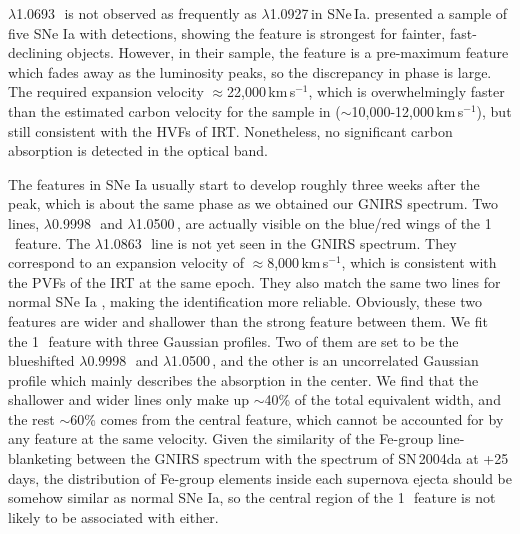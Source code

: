 \documentclass[twocolumn]{aastex631}
\begin{document}
 $\lambda$1.0693\,\micron\ is not observed as frequently as  $\lambda$1.0927\,\micron in SNe\,Ia. \citet{Hsiao_CSP_2019} presented a sample of five SNe Ia with  detections, showing the  feature is strongest for fainter, fast-declining objects. However, in their sample, the  feature is a pre-maximum feature which fades away as the luminosity peaks, so the discrepancy in phase is large. The required expansion velocity $\approx$22,000\,km\,s$^{-1}$, which is overwhelmingly faster than the estimated carbon velocity for the sample in \citet{Hsiao_CSP_2019} ($\sim$10,000-12,000\,km\,s$^{-1}$), but still consistent with the HVFs of  IRT. Nonetheless, no significant carbon absorption is detected in the optical band.

The  features in SNe Ia usually start to develop roughly three weeks after the peak, which is about the same phase as we obtained our GNIRS spectrum. Two  lines, $\lambda$0.9998\,\micron\ and $\lambda$1.0500\,\micron, are actually visible on the blue/red wings of the 1\,\micron\ feature. The  $\lambda$1.0863\,\micron\ line is not yet seen in the GNIRS spectrum. They correspond to an expansion velocity of $\approx$8,000\,km\,s$^{-1}$, which is consistent with the PVFs of the  IRT at the same epoch. They also match the same two lines for normal SNe Ia \citep{Marion2009_NIR}, making the identification more reliable. Obviously, these two  features are wider and shallower than the strong feature between them. We fit the 1\,\micron\ feature with three Gaussian profiles. Two of them are set to be the blueshifted  $\lambda$0.9998\,\micron\ and $\lambda$1.0500\,\micron, and the other is an uncorrelated Gaussian profile which mainly describes the absorption in the center. We find that the shallower and wider  lines only make up $\sim$40\% of the total equivalent width, and the rest $\sim$60\% comes from the central feature, which cannot be accounted for by any  feature at the same velocity. Given the similarity of the Fe-group line-blanketing between the GNIRS spectrum with the spectrum of SN\,2004da at +25\,days, the distribution of Fe-group elements inside each supernova ejecta should be somehow similar as normal SNe Ia, so the central region of the 1\,\micron\ feature is not likely to be associated with  either.
\end{document}
